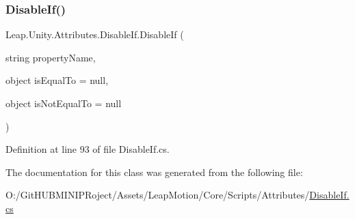 \subsubsection{\texorpdfstring{DisableIf()}{DisableIf()}}
{\footnotesize\ttfamily Leap.\+Unity.\+Attributes.\+Disable\+If.\+Disable\+If (\begin{DoxyParamCaption}\item[{string}]{property\+Name,  }\item[{object}]{is\+Equal\+To = {\ttfamily null},  }\item[{object}]{is\+Not\+Equal\+To = {\ttfamily null} }\end{DoxyParamCaption})}



Definition at line 93 of file Disable\+If.\+cs.



The documentation for this class was generated from the following file\+:\begin{DoxyCompactItemize}
\item 
O\+:/\+Git\+H\+U\+B\+M\+I\+N\+I\+P\+Roject/\+Assets/\+Leap\+Motion/\+Core/\+Scripts/\+Attributes/\mbox{\hyperlink{_disable_if_8cs}{Disable\+If.\+cs}}\end{DoxyCompactItemize}
